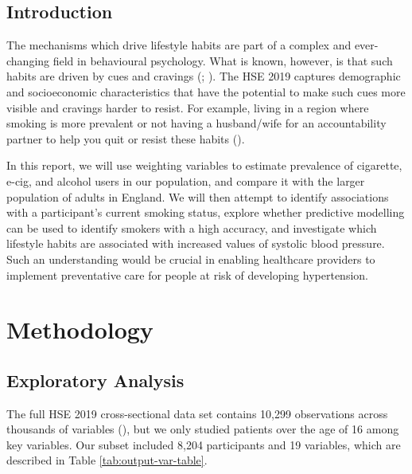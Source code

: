 \documentclass[
  11pt,
  twocolumn]{article}
\begin{document}
\subsection{Introduction}\label{introduction}

The mechanisms which drive lifestyle habits are part of a complex and
ever-changing field in behavioural psychology. What is known, however,
is that such habits are driven by cues and cravings
(;
). The HSE 2019 captures
demographic and socioeconomic characteristics that have the potential to
make such cues more visible and cravings harder to resist. For example,
living in a region where smoking is more prevalent or not having a
husband/wife for an accountability partner to help you quit or resist
these habits ().

In this report, we will use weighting variables to estimate prevalence
of cigarette, e-cig, and alcohol users in our population, and compare it
with the larger population of adults in England. We will then attempt to
identify associations with a participant's current smoking status,
explore whether predictive modelling can be used to identify smokers
with a high accuracy, and investigate which lifestyle habits are
associated with increased values of systolic blood pressure. Such an
understanding would be crucial in enabling healthcare providers to
implement preventative care for people at risk of developing
hypertension.

\section{Methodology}\label{methodology}

\subsection{Exploratory Analysis}\label{exploratory-analysis}

The full HSE 2019 cross-sectional data set contains 10,299 observations
across thousands of variables (), but we only studied patients over the age of
16 among key variables. Our subset included 8,204 participants and 19
variables, which are described in Table \ref{tab:output-var-table}.
\end{document}
